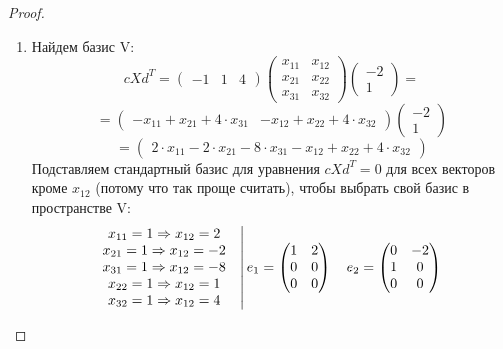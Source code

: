 \documentclass[11pt, fleqn]{article}
\begin{document}
\begin{proof}
  \begin{enumerate}
    \item Найдем базис V:
    \[c X d^T = \begin{pmatrix}
          -1 & 1 & 4
      \end{pmatrix} \begin{pmatrix}
        x_{11} & x_{12}\\
        x_{21} & x_{22}\\
        x_{31} & x_{32}
      \end{pmatrix} \begin{pmatrix}
        -2\\
        1
      \end{pmatrix} =\]
      \[= \begin{pmatrix}
        -x_{11} + x_{21} + 4 \cdot x_{31} & -x_{12} + x_{22} + 4 \cdot x_{32}
      \end{pmatrix} \begin{pmatrix}
        -2\\
        1
      \end{pmatrix}\]
      \[= \begin{pmatrix}
        2 \cdot x_{11} - 2 \cdot x_{21} - 8 \cdot x_{31} - x_{12} + x_{22} + 4 \cdot x_{32}
      \end{pmatrix}\]
      Подставляем стандартный базис для уравнения $c X d^T = 0$ для всех векторов кроме $x_{12}$ (потому что так проще считать), чтобы выбрать свой базис в пространстве V:
      \[
      \left.
      \begin{matrix}
        x_{11} = 1 \Rightarrow x_{12} = 2\\
        x_{21} = 1 \Rightarrow x_{12} = -2\\
        x_{31} = 1 \Rightarrow x_{12} = -8\\
        x_{22} = 1 \Rightarrow x_{12} = 1\\
        x_{32} = 1 \Rightarrow x_{12} = 4
      \end{matrix} \quad \right|
      \begin{matrix}
        e_1 =
        \begin{pmatrix}
          1 & 2\\
          0 & 0\\
          0 & 0
        \end{pmatrix} \quad
        e_2 =
        \begin{pmatrix}
          0 & -2\\
          1 & 0\\
          0 & 0

\end{pmatrix}
\end{matrix}\]
\end{enumerate}
\end{proof}
\end{document}
